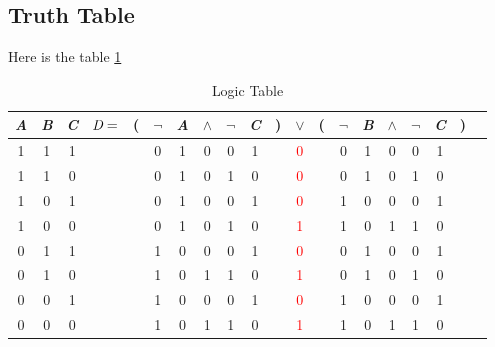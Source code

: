 \documentclass{scrartcl}
\begin{document}
  \subsection{Truth Table}
    Here is the table \ref{tab:IDK} \noindent \FloatBarrier
    \begin{table}[ht]
      \centering
      \caption{Logic Table}
      \begin{tabular}{@{ }c@{ }@{ }c@{ }@{ }c | c@{ }@{}c@{}@{ }c@{ }@{ }c@{ }@{ }c@{ }@{ }c@{ }@{ }c@{ }@{}c@{}@{ }c@{ }@{}c@{}@{ }c@{ }@{ }c@{ }@{ }c@{ }@{ }c@{ }@{ }c@{ }@{}c@{}@{ }c}
        \emph{A} & \emph{B} & \emph{C} & $\emph{D}=$ & ( & $\lnot$ & \emph{A} & $\land$ & $\lnot$ & \emph{C} & ) & $\lor$             & ( & $\lnot$ & \emph{B} & $\land$ & $\lnot$ & \emph{C} & ) & \\
        \hline
        1        & 1        & 1        &             &   & 0       & 1        & 0       & 0       & 1        &   & \textcolor{red}{0} &   & 0       & 1        & 0       & 0       & 1        &   & \\
        1        & 1        & 0        &             &   & 0       & 1        & 0       & 1       & 0        &   & \textcolor{red}{0} &   & 0       & 1        & 0       & 1       & 0        &   & \\
        1        & 0        & 1        &             &   & 0       & 1        & 0       & 0       & 1        &   & \textcolor{red}{0} &   & 1       & 0        & 0       & 0       & 1        &   & \\
        1        & 0        & 0        &             &   & 0       & 1        & 0       & 1       & 0        &   & \textcolor{red}{1} &   & 1       & 0        & 1       & 1       & 0        &   & \\
        0        & 1        & 1        &             &   & 1       & 0        & 0       & 0       & 1        &   & \textcolor{red}{0} &   & 0       & 1        & 0       & 0       & 1        &   & \\
        0        & 1        & 0        &             &   & 1       & 0        & 1       & 1       & 0        &   & \textcolor{red}{1} &   & 0       & 1        & 0       & 1       & 0        &   & \\
        0        & 0        & 1        &             &   & 1       & 0        & 0       & 0       & 1        &   & \textcolor{red}{0} &   & 1       & 0        & 0       & 0       & 1        &   & \\
        0        & 0        & 0        &             &   & 1       & 0        & 1       & 1       & 0        &   & \textcolor{red}{1} &   & 1       & 0        & 1       & 1       & 0        &   & \\
      \end{tabular}
      \label{tab:IDK}
    \end{table}
    \FloatBarrier
\end{document}
